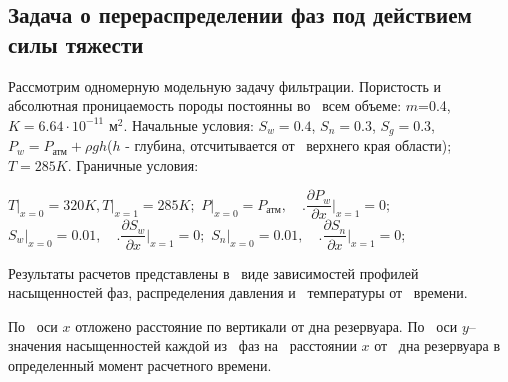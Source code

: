 \subsection{Задача о перераспределении фаз под действием силы тяжести}
Рассмотрим одномерную модельную задачу фильтрации. Пористость и~
абсолютная проницаемость породы постоянны во~ всем объеме:  $m$=0.4,\; $K=6.64\cdot 10^{-11}$ м$^2$.
Начальные условия:\; $S_w=0.4$,\; $S_n=0.3$,\; $S_g=0.3$, 
$P_w=P_\text{атм}+\rho g h$($h$ - глубина, отсчитывается от~ верхнего края области);
$T=285K$. Граничные условия:

$\left.T\right|_{x=0}=320K, \left.T\right|_{x=1}=285K;$
$\left.P\right|_{x=0}=P_{\text{атм}},\quad \Biggl.\dfrac{\partial{P_w}}{\partial{x}}\Biggr|_{x=1}=0;$
$\left.S_w\right|_{x=0}=0.01,\quad \Biggl.\dfrac{\partial{S_w}}{\partial{x}}\Biggr|_{x=1}=0;$
$\left.S_n\right|_{x=0}=0.01,\quad \Biggl.\dfrac{\partial{S_n}}{\partial{x}}\Biggr|_{x=1}=0;$

Результаты расчетов представлены в~ виде зависимостей профилей насыщенностей фаз,
распределения давления и~ температуры от~ времени.

По~ оси $x$ отложено расстояние по вертикали от дна резервуара. По~ оси $y$--
значения насыщенностей каждой из~ фаз на~ расстоянии $x$ от~ дна резервуара
в~ определенный момент расчетного времени.

